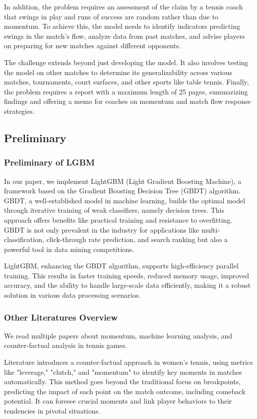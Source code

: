 \documentclass{mcmthesis}
\begin{document}
In addition, the problem requires an assessment of the claim by a tennis coach that swings in play and runs of success are random rather than due to momentum. To achieve this, the model needs to identify indicators predicting swings in the match's flow, analyze data from past matches, and advise players on preparing for new matches against different opponents.

The challenge extends beyond just developing the model. It also involves testing the model on other matches to determine its generalizability across various matches, tournaments, court surfaces, and other sports like table tennis. Finally, the problem requires a report with a maximum length of 25 pages, summarizing findings and offering a memo for coaches on momentum and match flow response strategies.

\subsection{Preliminary}
\subsubsection{Preliminary of LGBM}
In our paper, we implement LightGBM (Light Gradient Boosting Machine), a framework based on the Gradient Boosting Decision Tree (GBDT) algorithm. GBDT, a well-established model in machine learning, builds the optimal model through iterative training of weak classifiers, namely decision trees. This approach offers benefits like practical training and resistance to overfitting. GBDT is not only prevalent in the industry for applications like multi-classification, click-through rate prediction, and search ranking but also a powerful tool in data mining competitions. 

LightGBM, enhancing the GBDT algorithm, supports high-efficiency parallel training. This results in faster training speeds, reduced memory usage, improved accuracy, and the ability to handle large-scale data efficiently, making it a robust solution in various data processing scenarios.

\subsubsection{Other Literatures Overview}
We read multiple papers about momentum, machine learning analysis, and counter-factual analysis in tennis games.

Literature \cite{1} introduces a counter-factual approach in women's tennis, using metrics like "leverage," "clutch," and "momentum" to identify key moments in matches automatically. This method goes beyond the traditional focus on breakpoints, predicting the impact of each point on the match outcome, including comeback potential. It can foresee crucial moments and link player behaviors to their tendencies in pivotal situations.
\end{document}
